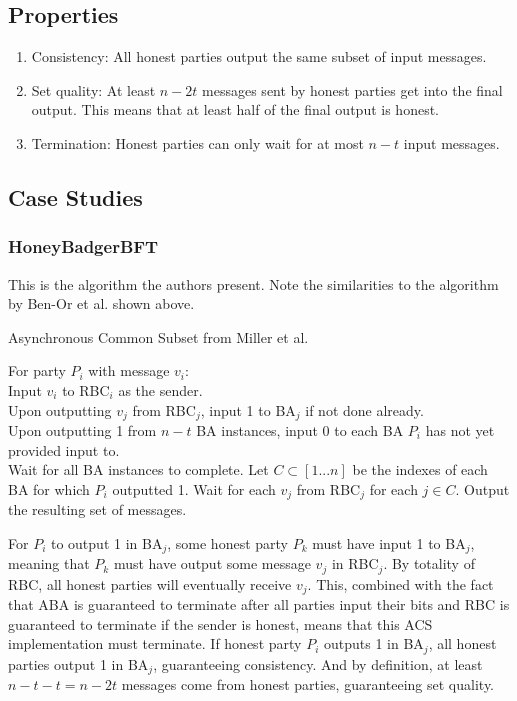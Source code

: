\documentclass{article}
\begin{document}
\subsection{Properties}
\begin{enumerate}
    \item Consistency: All honest parties output the same subset of input messages.
    \item Set quality: At least $n - 2t$ messages sent by honest parties get into the final output. This means that at least half of the final output is honest.
    \item Termination: Honest parties can only wait for at most $n - t$ input messages.
\end{enumerate}
 
\subsection{Case Studies}
\subsubsection{HoneyBadgerBFT}
This is the algorithm the authors present. Note the similarities to the algorithm by Ben-Or et al. shown above.

\begin{algorithm}\label{honeybadger-acs}
\caption{Asynchronous Common Subset  from Miller et al. \cite{miller2016honey}}

For party $P_i$ with message $v_i$: \\
Input $v_i$ to RBC$_i$ as the sender.\\
Upon outputting $v_j$ from RBC$_j$, input 1 to BA$_j$ if not done already.\\
Upon outputting 1 from $n - t$ BA instances, input 0 to each BA $P_i$ has not yet provided input to.\\
Wait for all BA instances to complete. Let $C \subset [1...n]$ be the indexes of each BA for which $P_i$ outputted 1. Wait for each $v_j$ from RBC$_j$ for each $j \in C$. Output the resulting set of messages.
\SetAlgoLined
\SetAlgoNoEnd
\end{algorithm}
For $P_i$ to output 1 in BA$_j$, some honest party $P_k$ must have input 1 to BA$_j$, meaning that $P_k$ must have output some message $v_j$ in RBC$_j$. By totality of RBC, all honest parties will eventually receive $v_j$. This, combined with the fact that ABA is guaranteed to terminate after all parties input their bits and RBC is guaranteed to terminate if the sender is honest, means that this ACS implementation must terminate. If honest party $P_i$ outputs 1 in BA$_j$, all honest parties output 1 in BA$_j$, guaranteeing consistency. And by definition, at least $n - t - t = n - 2t$ messages come from honest parties, guaranteeing set quality.
\end{document}
